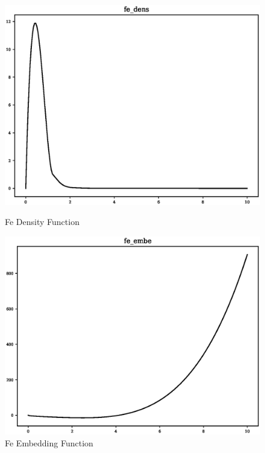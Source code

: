 \begin{figure}[ht]
\begin{minipage}[b]{0.5\linewidth}
    \includegraphics[width=.9\linewidth]{chapters/results_potential_fitting/pot_fepd_fcc_1/fe_dens.eps} 
    \caption{Fe Density Function} 
  \end{minipage}%
  \begin{minipage}[b]{0.5\linewidth}
    \centering
    \includegraphics[width=.9\linewidth]{chapters/results_potential_fitting/pot_fepd_fcc_1/fe_embe.eps} 
    \caption{Fe Embedding Function} 
  \end{minipage} 
  \label{fig:ironFCCPotentialPlots} 
\end{figure}
\FloatBarrier


